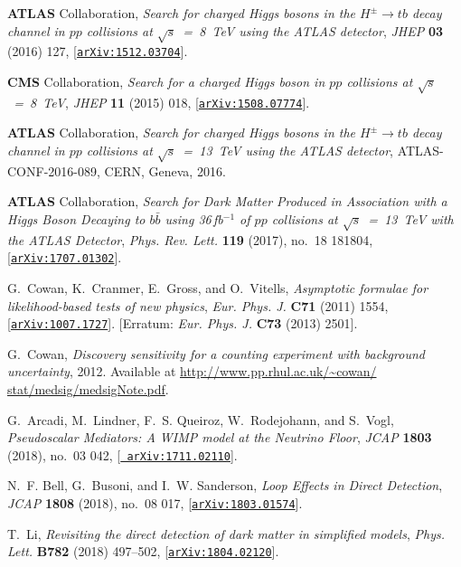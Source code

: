 \documentclass[review]{elsarticle}
\begin{document}
\begin{thebibliography}{100}
{\bf ATLAS} Collaboration, {\it {Search for charged Higgs bosons
  in the $H^{\pm} \rightarrow tb$ decay channel in $pp$ collisions at
  $\sqrt{s}$~=~8~TeV using the ATLAS detector}},  {\em JHEP} {\bf 03} (2016)
  127, [\href{http://arxiv.org/abs/1512.03704}{{\tt arXiv:1512.03704}}].

{\bf CMS} Collaboration, {\it {Search for a charged
  Higgs boson in $pp$ collisions at $ \sqrt{s}$~=~8~TeV}},  {\em JHEP} {\bf 11}
  (2015) 018, [\href{http://arxiv.org/abs/1508.07774}{{\tt arXiv:1508.07774}}].

{\bf ATLAS} Collaboration, {\it {Search for charged Higgs bosons in the
  $H^{\pm}\to tb$ decay channel in $pp$ collisions at $\sqrt{s}$~=~13~TeV using
  the ATLAS detector}},  ATLAS-CONF-2016-089, CERN, Geneva,
  2016.

{\bf ATLAS} Collaboration, {\it {Search for Dark Matter
  Produced in Association with a Higgs Boson Decaying to $b\bar b$ using 36$\,$fb$^{-1}$ 
  of $pp$ collisions at $\sqrt s$~=~13~TeV with the ATLAS Detector}},
  {\em Phys. Rev. Lett.} {\bf 119} (2017), no.~18 181804,
  [\href{http://arxiv.org/abs/1707.01302}{{\tt arXiv:1707.01302}}].

G.~Cowan, K.~Cranmer, E.~Gross, and O.~Vitells, {\it {Asymptotic formulae for
  likelihood-based tests of new physics}},  {\em Eur. Phys. J.} {\bf C71}
  (2011) 1554, [\href{http://arxiv.org/abs/1007.1727}{{\tt arXiv:1007.1727}}].
  [Erratum: {\it Eur. Phys. J.} {\bf C73} (2013) 2501].

G.~Cowan, {\it {Discovery sensitivity for a counting experiment with background
  uncertainty}},  2012.
\newblock Available at \url{http://www.pp.rhul.ac.uk/~cowan/
  stat/medsig/medsigNote.pdf}.

G.~Arcadi, M.~Lindner, F.~S. Queiroz, W.~Rodejohann, and S.~Vogl, {\it
  {Pseudoscalar Mediators: A WIMP model at the Neutrino Floor}},  {\em JCAP}
  {\bf 1803} (2018), no.~03 042, [\href{http://arxiv.org/abs/1711.02110}{{\tt
  arXiv:1711.02110}}].

N.~F. Bell, G.~Busoni, and I.~W. Sanderson, {\it {Loop Effects in Direct
  Detection}},  {\em JCAP} {\bf 1808} (2018), no.~08 017,
  [\href{http://arxiv.org/abs/1803.01574}{{\tt arXiv:1803.01574}}].

T.~Li, {\it {Revisiting the direct detection of dark matter in simplified
  models}},  {\em Phys. Lett.} {\bf B782} (2018) 497--502,
  [\href{http://arxiv.org/abs/1804.02120}{{\tt arXiv:1804.02120}}].


\end{thebibliography}
\end{document}
